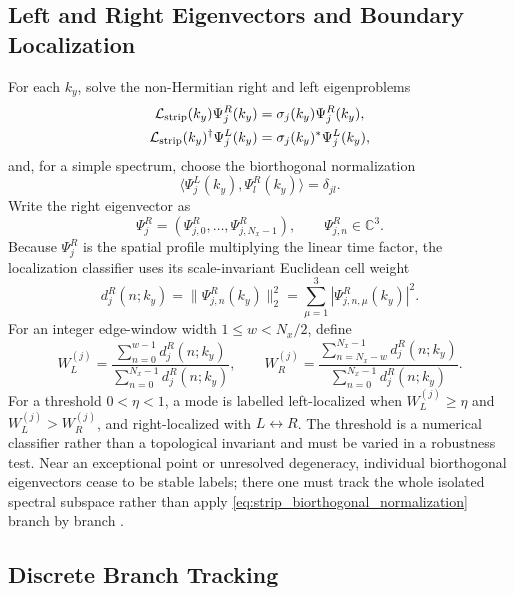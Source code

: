 \documentclass[11pt]{article}
\numberwithin{equation}{section}
\begin{document}
\subsection{Left and Right Eigenvectors and Boundary Localization}

For each $k_y$, solve the non-Hermitian right and left eigenproblems
\begin{align}
  \mathcal L_{\rm strip}(k_y)\Psi_j^R(k_y)
  &=\sigma_j(k_y)\Psi_j^R(k_y),\nonumber\\
  \mathcal L_{\rm strip}(k_y)^\dagger\Psi_j^L(k_y)
  &=\sigma_j(k_y)^*\Psi_j^L(k_y),
  \label{eq:strip_left_right_eigenvectors}
\end{align}
and, for a simple spectrum, choose the biorthogonal normalization
\begin{equation}
  \langle\Psi_j^L(k_y),\Psi_l^R(k_y)\rangle=\delta_{jl}.
  \label{eq:strip_biorthogonal_normalization}
\end{equation}
Write the right eigenvector as
\begin{equation}
  \Psi_j^R=(\Psi_{j,0}^R,\ldots,\Psi_{j,N_x-1}^R),
  \qquad \Psi_{j,n}^R\in\mathbb C^3.
\end{equation}
Because $\Psi_j^R$ is the spatial profile multiplying the linear time
factor, the localization classifier uses its scale-invariant Euclidean
cell weight
\begin{equation}
  d_j^R(n;k_y)=\|\Psi_{j,n}^R(k_y)\|_2^2
  =\sum_{\mu=1}^3|\Psi_{j,n,\mu}^R(k_y)|^2.
\end{equation}
For an integer edge-window width $1\leq w<N_x/2$, define
\begin{equation}
  W_L^{(j)}=
  \frac{\sum_{n=0}^{w-1}d_j^R(n;k_y)}
       {\sum_{n=0}^{N_x-1}d_j^R(n;k_y)},
  \qquad
  W_R^{(j)}=
  \frac{\sum_{n=N_x-w}^{N_x-1}d_j^R(n;k_y)}
       {\sum_{n=0}^{N_x-1}d_j^R(n;k_y)}.
  \label{eq:strip_edge_weights}
\end{equation}
For a threshold $0<\eta<1$, a mode is labelled left-localized when
$W_L^{(j)}\geq\eta$ and $W_L^{(j)}>W_R^{(j)}$, and right-localized with
$L\leftrightarrow R$.  The threshold is a numerical classifier rather
than a topological invariant and must be varied in a robustness test.
Near an exceptional point or unresolved degeneracy, individual
biorthogonal eigenvectors cease to be stable labels; there one must track
the whole isolated spectral subspace rather than apply
\eqref{eq:strip_biorthogonal_normalization} branch by branch
\cite{Kunst2018}.

\subsection{Discrete Branch Tracking}
\end{document}
